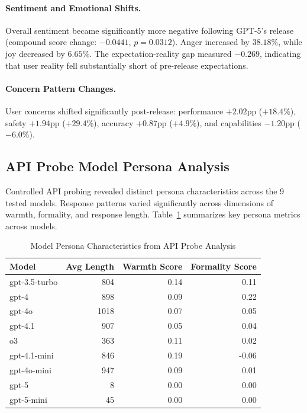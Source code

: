 \documentclass{article}
\begin{document}
\paragraph{Sentiment and Emotional Shifts.}
Overall sentiment became significantly more negative following GPT-5's release (compound score change: $-0.0441$, $p=0.0312$). Anger increased by $38.18\%$, while joy decreased by $6.65\%$. The expectation-reality gap measured $-0.269$, indicating that user reality fell substantially short of pre-release expectations.

\paragraph{Concern Pattern Changes.}
User concerns shifted significantly post-release: performance $+2.02$pp ($+18.4\%$), safety $+1.94$pp ($+29.4\%$), accuracy $+0.87$pp ($+4.9\%$), and capabilities $-1.20$pp ($-6.0\%$).

\subsection{API Probe Model Persona Analysis}

Controlled API probing revealed distinct persona characteristics across the 9 tested models. Response patterns varied significantly across dimensions of warmth, formality, and response length. Table~\ref{tab:model_personas} summarizes key persona metrics across models.

\begin{table}[htbp]
\centering
\label{tab:model_personas}
\begin{tabular}{@{}lrrr@{}}
\toprule
Model & Avg Length & Warmth Score & Formality Score \\
\midrule
gpt-3.5-turbo & 804 & 0.14 & 0.11 \\
gpt-4 & 898 & 0.09 & 0.22 \\
gpt-4o & 1018 & 0.07 & 0.05 \\
gpt-4.1 & 907 & 0.05 & 0.04 \\
o3 & 363 & 0.11 & 0.02 \\
gpt-4.1-mini & 846 & 0.19 & -0.06 \\
gpt-4o-mini & 947 & 0.09 & 0.01 \\
gpt-5 & 8 & 0.00 & 0.00 \\
gpt-5-mini & 45 & 0.00 & 0.00 \\
\bottomrule
\end{tabular}
\caption{Model Persona Characteristics from API Probe Analysis}
\end{table}
\end{document}
